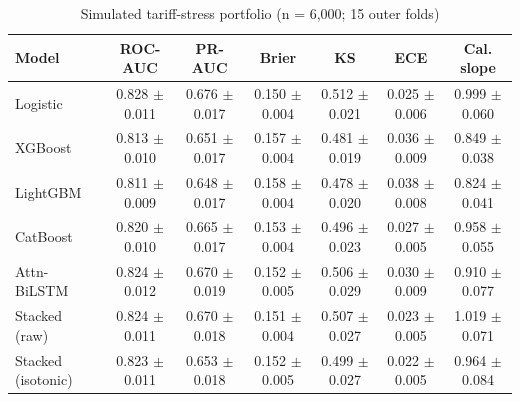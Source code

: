 \documentclass[conference,a4paper]{IEEEtran}
\begin{document}
\begin{table}[!t]
\caption{Simulated tariff-stress portfolio (n = 6,000; 15 outer folds)}
\centering
\footnotesize
\renewcommand{\arraystretch}{1.1}
\begin{tabular}{lcccccc}
\toprule
Model & ROC-AUC & PR-AUC & Brier & KS & ECE & Cal. slope \\
\midrule
Logistic & 0.828 $\pm$ 0.011 & 0.676 $\pm$ 0.017 & 0.150 $\pm$ 0.004 & 0.512 $\pm$ 0.021 & 0.025 $\pm$ 0.006 & 0.999 $\pm$ 0.060 \\
XGBoost & 0.813 $\pm$ 0.010 & 0.651 $\pm$ 0.017 & 0.157 $\pm$ 0.004 & 0.481 $\pm$ 0.019 & 0.036 $\pm$ 0.009 & 0.849 $\pm$ 0.038 \\
LightGBM & 0.811 $\pm$ 0.009 & 0.648 $\pm$ 0.017 & 0.158 $\pm$ 0.004 & 0.478 $\pm$ 0.020 & 0.038 $\pm$ 0.008 & 0.824 $\pm$ 0.041 \\
CatBoost & 0.820 $\pm$ 0.010 & 0.665 $\pm$ 0.017 & 0.153 $\pm$ 0.004 & 0.496 $\pm$ 0.023 & 0.027 $\pm$ 0.005 & 0.958 $\pm$ 0.055 \\
Attn-BiLSTM & 0.824 $\pm$ 0.012 & 0.670 $\pm$ 0.019 & 0.152 $\pm$ 0.005 & 0.506 $\pm$ 0.029 & 0.030 $\pm$ 0.009 & 0.910 $\pm$ 0.077 \\
Stacked (raw) & 0.824 $\pm$ 0.011 & 0.670 $\pm$ 0.018 & 0.151 $\pm$ 0.004 & 0.507 $\pm$ 0.027 & 0.023 $\pm$ 0.005 & 1.019 $\pm$ 0.071 \\
Stacked (isotonic) & 0.823 $\pm$ 0.011 & 0.653 $\pm$ 0.018 & 0.152 $\pm$ 0.005 & 0.499 $\pm$ 0.027 & 0.022 $\pm$ 0.005 & 0.964 $\pm$ 0.084 \\
\bottomrule
\end{tabular}
\end{table}
\end{document}
